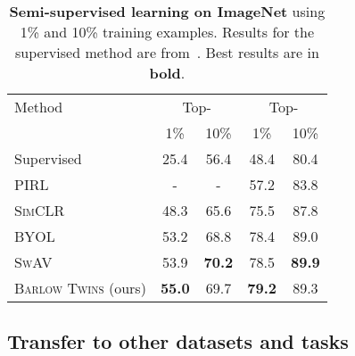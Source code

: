 \documentclass{article}
\newcommand{\AlgoName}{\textsc{Barlow Twins}}
\begin{document}
\begin{table}[ht]
\caption{\textbf{Semi-supervised learning on ImageNet} using 1\% and 10\% training examples. Results for the supervised method are from~\cite{zhai2019s4l}. Best results are in \textbf{bold}.}
\label{tab:abl-semisupervised}
\vskip 0.15in
\begin{center}
\begin{tabular}{lcccc}
\toprule
Method     & \multicolumn{2}{c}{Top-} & \multicolumn{2}{c}{Top-} \\
\cmidrule(lr){2-3}\cmidrule(lr){4-5}
          &  1\% & 10\%            & 1\% & 10\% \\
\midrule
Supervised         & 25.4 & 56.4 & 48.4 & 80.4 \\
\midrule
\textsc{PIRL}               & - & -           & 57.2 & 83.8\\
\textsc{SimCLR}    & 48.3 & 65.6 & 75.5 & 87.8\\
\textsc{BYOL}      & 53.2 & 68.8 & 78.4 & 89.0\\
\textsc{SwAV}               & 53.9 & \bf{70.2} & 78.5 & \bf{89.9}\\
\AlgoName{} (ours) & \bf{55.0} & 69.7 & \bf{79.2} & 89.3\\
\bottomrule
\end{tabular}
\end{center}
\vskip -0.1in
\end{table}

\subsection{Transfer to other datasets and tasks}
\end{document}
